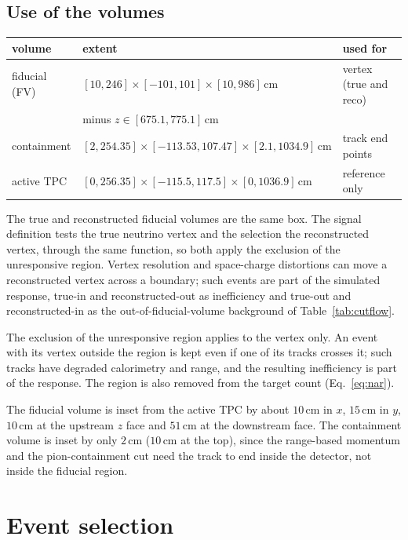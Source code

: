 \documentclass[11pt,a4paper]{article}
\newcommand{\cm}{\,\text{cm}}
\begin{document}
\subsection{Use of the volumes}
\label{sec:fv_where}

\begin{center}\small
\begin{tabular}{lll}
\toprule
volume & extent & used for \\\midrule
fiducial (FV) & $[10,246]\times[-101,101]\times[10,986]\cm$ & vertex (true and reco) \\
 & minus $z\in[675.1,775.1]\cm$ & \\
containment & $[2,254.35]\times[-113.53,107.47]\times[2.1,1034.9]\cm$ & track end points \\
active TPC & $[0,256.35]\times[-115.5,117.5]\times[0,1036.9]\cm$ & reference only \\
\bottomrule
\end{tabular}
\end{center}

The true and reconstructed fiducial volumes are the same box. The signal definition tests the true
neutrino vertex and the selection the reconstructed vertex, through the same function, so both
apply the exclusion of the unresponsive region. Vertex resolution and space-charge distortions can
move a reconstructed vertex across a boundary; such events are part of the simulated response,
true-in and reconstructed-out as inefficiency and true-out and reconstructed-in as the
out-of-fiducial-volume background of Table~\ref{tab:cutflow}.

The exclusion of the unresponsive region applies to the vertex only. An event with its vertex
outside the region is kept even if one of its tracks crosses it; such tracks have degraded
calorimetry and range, and the resulting inefficiency is part of the response. The region is also
removed from the target count (Eq.~\eqref{eq:nar}).

The fiducial volume is inset from the active TPC by about $10\cm$ in $x$, $15\cm$ in $y$, $10\cm$
at the upstream $z$ face and $51\cm$ at the downstream face. The containment volume is inset by
only $2\cm$ ($10\cm$ at the top), since the range-based momentum and the pion-containment cut need
the track to end inside the detector, not inside the fiducial region.


\section{Event selection}
\label{sec:selection}
\end{document}
